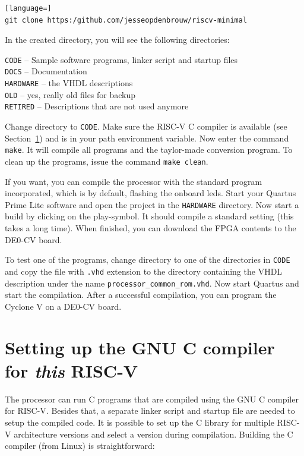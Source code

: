 \documentclass[12pt]{article}
\begin{document}
\begin{lstlisting}[language=]
git clone https:/github.com/jesseopdenbrouw/riscv-minimal
\end{lstlisting}

In the created directory, you will see the following directories:

\texttt{CODE} -- Sample software programs, linker script and startup files\\
\texttt{DOCS} -- Documentation\\
\texttt{HARDWARE} -- the VHDL descriptions \\
\texttt{OLD} -- yes, really old files for backup\\
\texttt{RETIRED} -- Descriptions that are not used anymore

Change directory to \texttt{CODE}. Make sure the RISC-V C compiler is available (see Section~\ref{sec:ccompiler}) and is in your path environment variable. Now enter the command \texttt{make}. It will compile all programs and the taylor-made conversion program. To clean up the programs, issue the command \texttt{make clean}.

If you want, you can compile the processor with the standard program incorporated, which is by default, flashing the onboard leds. Start your Quartus Prime Lite software and open the project in the \texttt{HARDWARE} directory. Now start a build by clicking on the play-symbol. It should compile a standard setting (this takes a long time). When finished, you can download the FPGA contents to the DE0-CV board.

To test one of the programs, change directory to one of the directories in \texttt{CODE} and copy the file with \texttt{.vhd} extension to the directory containing the VHDL description under the name \texttt{processor\_common\_rom.vhd}.
Now start Quartus and start the compilation. After a successful compilation, you can program the Cyclone V on a DE0-CV board.

\section{Setting up the GNU C compiler for \textit{this} RISC-V}
\label{sec:ccompiler}
The processor can run C programs that are compiled using the GNU C compiler for RISC-V. Besides that, a separate linker script and startup file are needed to setup the compiled code. It is possible to set up the C library for multiple RISC-V architecture versions and select a version during compilation. Building the C compiler (from Linux) is straightforward:
\end{document}
